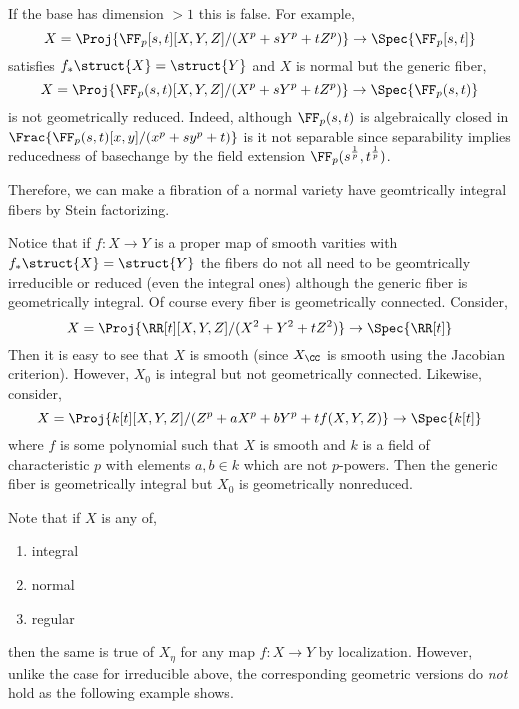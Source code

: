 \documentclass[12pt]{article}
\begin{document}
\begin{example}
If the base has dimension $> 1$ this is false. For example, 
\[ X = \Proj{\FF_p[s,t][X,Y,Z]/(X^p + s Y^p + t Z^p)} \to \Spec{\FF_p[s,t]} \]
satisfies $f_* \struct{X} = \struct{Y}$ and $X$ is normal but the generic fiber,
\[ X = \Proj{\FF_p(s,t)[X,Y,Z]/(X^p + s Y^p + t Z^p)} \to \Spec{\FF_p(s,t)} \]
is not geometrically reduced. Indeed, although $\FF_p(s,t)$ is algebraically closed in $\Frac{\FF_p(s,t)[x,y]/(x^p + s y^p + t)}$ is it not separable since separability implies reducedness of basechange by the field extension $\FF_p(s^{\frac{1}{p}}, t^{\frac{1}{p}})$.
\end{example}

\begin{rmk}
Therefore, we can make a fibration of a normal variety have geomtrically integral fibers by Stein factorizing.
\end{rmk}

\begin{example}
Notice that if $f : X \to Y$ is a proper map of smooth varities with $f_* \struct{X} = \struct{Y}$ the fibers do not all need to be geomtrically irreducible or reduced (even the integral ones) although the generic fiber is geometrically integral. Of course every fiber is geometrically connected. Consider,
\[ X = \Proj{\RR[t][X,Y,Z]/(X^2 + Y^2 + t Z^2)} \to \Spec{\RR[t]} \]
Then it is easy to see that $X$ is smooth (since $X_{\CC}$ is smooth using the Jacobian criterion). However, $X_0$ is integral but not geometrically connected. Likewise, consider,
\[ X = \Proj{k[t][X,Y,Z]/(Z^p + a X^p + b Y^p + t f(X,Y,Z)} \to \Spec{k[t]} \]
where $f$ is some polynomial such that $X$ is smooth and $k$ is a field of characteristic $p$ with elements $a,b \in k$ which are not $p$-powers. Then the generic fiber is geometrically integral but $X_0$ is geometrically nonreduced. 
\end{example}

\begin{rmk}
Note that if $X$ is any of,
\begin{enumerate}
\item integral
\item normal
\item regular
\end{enumerate}
then the same is true of $X_\eta$ for any map $f : X \to Y$ by localization. However, unlike the case for irreducible above, the corresponding geometric versions do \textit{not} hold as the following example shows.
\end{rmk}
\end{document}
